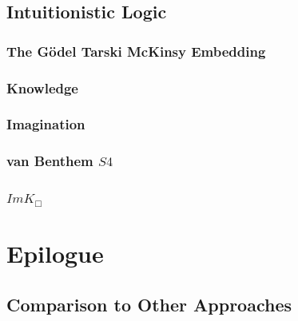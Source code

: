 \documentclass[11pt]{article}
\numberwithin{equation}{subsection}
\begin{document}
\subsection{Intuitionistic Logic}
\subsubsection{The G\"{o}del Tarski McKinsy Embedding}
\subsubsection{Knowledge}
\subsubsection{Imagination}
\subsubsection{van Benthem $S4$}
\subsubsection{$ImK_\Box$}



\section{Epilogue}\label{epilogue}
\subsection{Comparison to Other Approaches}
\end{document}
